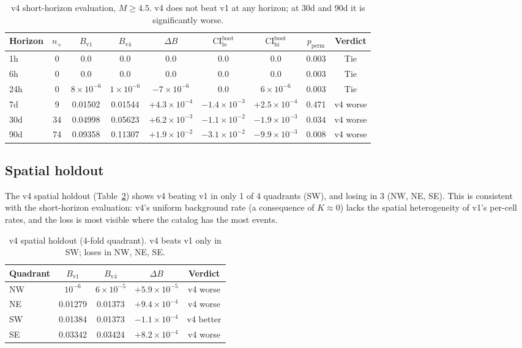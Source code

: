 \documentclass[10pt,a4paper,twocolumn]{article}
\begin{document}
\begin{table}[t]
\centering
\caption{v4 short-horizon evaluation, $M\geq4.5$. v4 does not beat v1 at any horizon; at 30d and 90d it is significantly worse.}\label{tab:v4-short-horizon}
\small
\begin{tabular*}{\textwidth}{@{\extracolsep{\fill}}lcccccccc}
\toprule
Horizon & $n_+$ & $B_{\text{v1}}$ & $B_{\text{v4}}$ & $\Delta B$ & $\text{CI}^{\text{boot}}_{\text{lo}}$ & $\text{CI}^{\text{boot}}_{\text{hi}}$ & $p_{\text{perm}}$ & Verdict \\
\midrule
1h  & 0 & 0.0       & 0.0       & 0.0       & 0.0       & 0.0       & 0.003 & Tie \\
6h  & 0 & 0.0       & 0.0       & 0.0       & 0.0       & 0.0       & 0.003 & Tie \\
24h & 0 & $8\times10^{-6}$ & $1\times10^{-6}$ & $-7\times10^{-6}$ & 0.0 & $6\times10^{-6}$ & 0.003 & Tie \\
7d  & 9 & 0.01502 & 0.01544 & $+4.3\times10^{-4}$ & $-1.4\times10^{-3}$ & $+2.5\times10^{-4}$ & 0.471 & v4 worse \\
30d & 34 & 0.04998 & 0.05623 & $+6.2\times10^{-3}$ & $-1.1\times10^{-2}$ & $-1.9\times10^{-3}$ & 0.034 & v4 worse \\
90d & 74 & 0.09358 & 0.11307 & $+1.9\times10^{-2}$ & $-3.1\times10^{-2}$ & $-9.9\times10^{-3}$ & 0.008 & v4 worse \\
\bottomrule
\end{tabular*}
\end{table}

\subsection{Spatial holdout}

The v4 spatial holdout (Table~\ref{tab:v4-holdout}) shows v4 beating v1 in only 1 of 4 quadrants (SW), and losing in 3 (NW, NE, SE). This is consistent with the short-horizon evaluation: v4's uniform background rate (a consequence of $K\approx0$) lacks the spatial heterogeneity of v1's per-cell rates, and the loss is most visible where the catalog has the most events.

\begin{table}[t]
\centering
\caption{v4 spatial holdout (4-fold quadrant). v4 beats v1 only in SW; loses in NW, NE, SE.}\label{tab:v4-holdout}
\small
\begin{tabular*}{\columnwidth}{@{\extracolsep{\fill}}lcccc}
\toprule
Quadrant & $B_{\text{v1}}$ & $B_{\text{v4}}$ & $\Delta B$ & Verdict \\
\midrule
NW & $10^{-6}$ & $6\times10^{-5}$ & $+5.9\times10^{-5}$ & v4 worse \\
NE & 0.01279 & 0.01373 & $+9.4\times10^{-4}$ & v4 worse \\
SW & 0.01384 & 0.01373 & $-1.1\times10^{-4}$ & v4 better \\
SE & 0.03342 & 0.03424 & $+8.2\times10^{-4}$ & v4 worse \\
\bottomrule
\end{tabular*}
\end{table}
\end{document}
